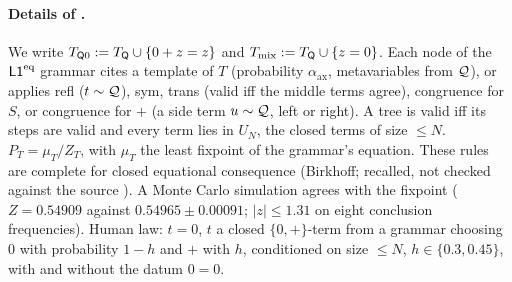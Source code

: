 \paragraph{Details of .} We write $T_{\mathsf{Q}0}:=T_{\mathsf{Q}}\cup\{0+z=z\}$ and $T_{\mathrm{mix}}:=T_{\mathsf{Q}}\cup\{z=0\}$. Each node of the $\mathord{\mathsf{L1}}^{\mathrm{eq}}$ grammar cites a template of $T$ (probability $\alpha_{\mathrm{ax}}$, metavariables from $\mathcal{Q}$), or applies refl ($t\sim\mathcal{Q}$), sym, trans (valid iff the middle terms agree), congruence for $S$, or congruence for $+$ (a side term $u\sim\mathcal{Q}$, left or right). A tree is valid iff its steps are valid and every term lies in $U_N$, the closed terms of size $\le N$. $P_T=\mu_T/Z_T$, with $\mu_T$ the least fixpoint of the grammar's equation. These rules are complete for closed equational consequence (Birkhoff; recalled, not checked against the source \citep{birkhoff1935structure}). A Monte Carlo simulation agrees with the fixpoint ($Z=0.54909$ against $0.54965\pm0.00091$; $|z|\le1.31$ on eight conclusion frequencies). Human law: $t=0$, $t$ a closed $\{0,+\}$-term from a grammar choosing $0$ with probability $1-h$ and $+$ with $h$, conditioned on size $\le N$, $h\in\{0.3,0.45\}$, with and without the datum $0=0$.

